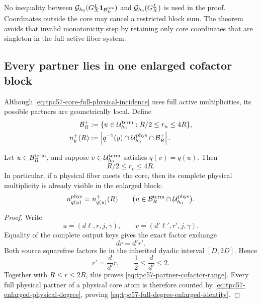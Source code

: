 No inequality between
\(\mathcal G_{h_0}(G_X^L\mathbf 1_{\mathcal B_R^{\rm pre}})\) and
\(\mathcal G_{h_0}(G_X^L)\) is used in the proof.  Coordinates outside the core
may cancel a restricted block sum.  The theorem avoids that invalid
monotonicity step by retaining only core coordinates that are singleton in
the full active fiber system.

\subsection{Every partner lies in one enlarged cofactor block}

Although \eqref{eq:tpc57-core-full-physical-incidence} uses full active
multiplicities, its possible partners are geometrically local.  Define
\begin{align}
 \mathcal B_R^+
 &:=\{u\in\mathcal U_{h_0}^{\rm term}:R/2\le r_u\le4R\},
 \label{eq:tpc57-enlarged-terminal-block}\\
 n_y^+(R)
 &:=\left|q^{-1}(y)\cap\mathcal U_{h_0}^{\rm phys}\cap\mathcal B_R^+\right|.
 \label{eq:tpc57-enlarged-physical-degree}
\end{align}

\begin{lemma}
\label{lem:tpc57-factor-exchange-localization}
Let \(u\in\mathcal B_R^{\rm term}\), and suppose
\(v\in\mathcal U_{h_0}^{\rm term}\) satisfies \(q(v)=q(u)\).  Then
\begin{equation}
 R/2\le r_v\le4R.
 \label{eq:tpc57-partner-cofactor-range}
\end{equation}
In particular, if a physical fiber meets the core, then its complete
physical multiplicity is already visible in the enlarged block:
\begin{equation}
 n_{q(u)}^{\rm phys}=n_{q(u)}^+(R)
 \qquad
 \bigl(u\in\mathcal B_R^{\rm term}\cap\mathcal U_{h_0}^{\rm phys}\bigr).
 \label{eq:tpc57-full-degree-enlarged-identity}
\end{equation}
\end{lemma}

\begin{proof}
Write
\[
 u=(d\ell,r,j,\gamma),
 \qquad
 v=(d'\ell',r',j,\gamma).
\]
Equality of the complete output keys gives the exact factor exchange
\begin{equation}
 dr=d'r'.
 \label{eq:tpc57-factor-exchange-equation}
\end{equation}
Both source squarefree factors lie in the inherited dyadic interval
\([D,2D]\).  Hence
\[
 r'=\frac d{d'}r,
 \qquad
 \frac12\le\frac d{d'}\le2.
\]
Together with \(R\le r\le2R\), this proves
\eqref{eq:tpc57-partner-cofactor-range}.  Every full physical partner of a
physical core atom is therefore counted by
\eqref{eq:tpc57-enlarged-physical-degree}, proving
\eqref{eq:tpc57-full-degree-enlarged-identity}.
\end{proof}

